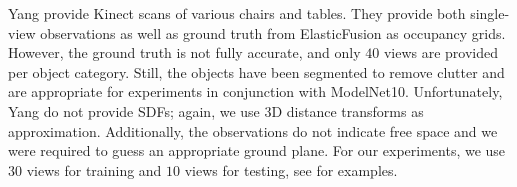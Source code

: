 

\boldparagraph{\Kinect}
%
Yang \etal provide Kinect scans of various chairs and tables. They provide both single-view observations as well as ground truth from ElasticFusion \citep{Whelan2015RSS} as occupancy grids. However, the ground truth is not fully accurate, and only $40$ views are provided per object category. Still, the objects have been segmented to remove clutter and are appropriate for experiments in conjunction with ModelNet10. Unfortunately, Yang \etal do not provide SDFs; again, we use 3D distance transforms as approximation. Additionally, the observations do not indicate free space and we were required to guess an appropriate ground plane. For our experiments, we use $30$ views for training and $10$ views for testing, see  for examples.

